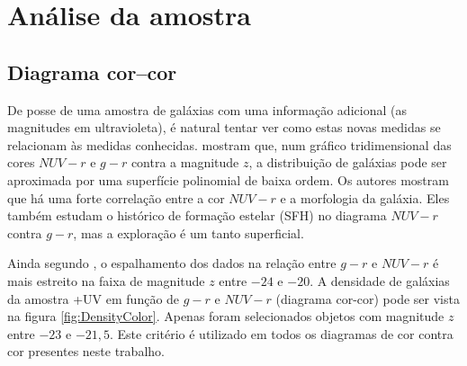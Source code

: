 



\chapter{Análise da amostra \STARLIGHTUV}
\label{sec:Analise}



\section{Diagrama cor--cor}

De posse de uma amostra de galáxias com uma informação adicional (as magnitudes
em ultravioleta), é natural tentar ver como estas novas medidas se relacionam às
medidas conhecidas. \citet{Chilingarian2011} mostram que, num gráfico
tridimensional das cores $NUV-r$ e $g-r$ contra a magnitude $z$, a distribuição
de galáxias pode ser aproximada por uma superfície polinomial de baixa ordem. Os
autores mostram que há uma forte correlação entre a cor $NUV-r$ e a morfologia
da galáxia. Eles também estudam o histórico de formação estelar (SFH) no
diagrama $NUV-r$ contra $g-r$, mas a exploração é um tanto superficial.

Ainda segundo \citet[figura 1, exemplo na figura 4]{Chilingarian2011}, o
espalhamento dos dados na relação entre $g-r$ e $NUV-r$ é mais estreito na faixa
de magnitude $z$ entre $-24$ e $-20$. A densidade de galáxias da amostra
\starlight+UV em função de $g-r$ e $NUV-r$ (diagrama cor-cor) pode ser vista na
figura \ref{fig:DensityColor}. Apenas foram selecionados objetos com magnitude
$z$ entre $-23$ e $-21,5$. Este critério é utilizado em todos os diagramas de
cor contra cor presentes neste trabalho.

